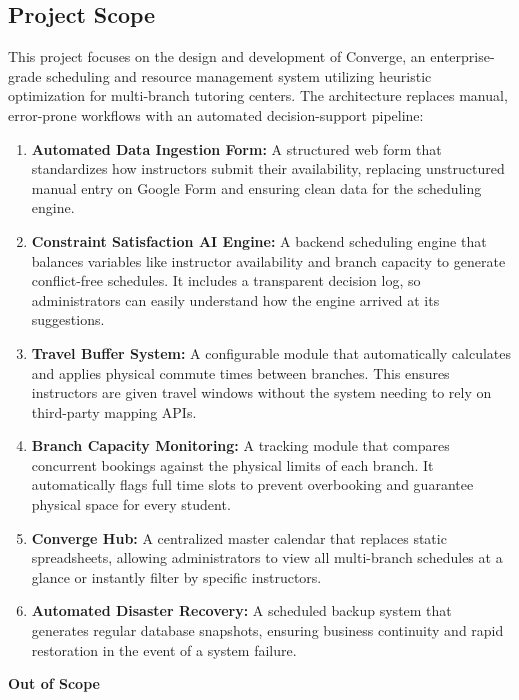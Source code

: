 \subsection{Project Scope}
This project focuses on the design and development of Converge, an enterprise-grade scheduling and resource management system utilizing heuristic optimization for multi-branch tutoring centers. The architecture replaces manual, error-prone workflows with an automated decision-support pipeline:
\begin{enumerate}
    \item \textbf{Automated Data Ingestion Form:} A structured web form that standardizes how instructors submit their availability, replacing unstructured manual entry on Google Form and ensuring clean data for the scheduling engine.
    \item \textbf{Constraint Satisfaction AI Engine:} A backend scheduling engine that balances variables like instructor availability and branch capacity to generate conflict-free schedules. It includes a transparent decision log, so administrators can easily understand how the engine arrived at its suggestions.
    \item \textbf{Travel Buffer System:} A configurable module that automatically calculates and applies physical commute times between branches. This ensures instructors are given travel windows without the system needing to rely on third-party mapping APIs.
    \item \textbf{Branch Capacity Monitoring:} A tracking module that compares concurrent bookings against the physical limits of each branch. It automatically flags full time slots to prevent overbooking and guarantee physical space for every student.
    \item \textbf{Converge Hub:} A centralized master calendar that replaces static spreadsheets, allowing administrators to view all multi-branch schedules at a glance or instantly filter by specific instructors.
    \item \textbf{Automated Disaster Recovery:} A scheduled backup system that generates regular database snapshots, ensuring business continuity and rapid restoration in the event of a system failure.
\end{enumerate}
\textbf{Out of Scope}
